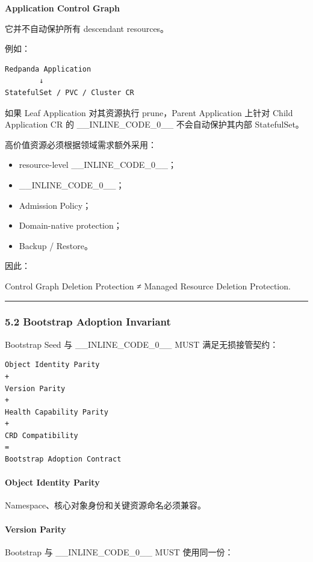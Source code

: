 \documentclass[11pt,a4paper]{article}
\begin{document}
\begin{gfmBlockquote}
\textbf{Application Control Graph}
\end{gfmBlockquote}
它并不自动保护所有 descendant resources。

例如：

\begin{lstlisting}[language=text]
Redpanda Application
        ↓
StatefulSet / PVC / Cluster CR
\end{lstlisting}
如果 Leaf Application 对其资源执行 prune，Parent Application 上针对 Child Application CR 的 \_\_INLINE\_CODE\_0\_\_ 不会自动保护其内部 StatefulSet。

高价值资源必须根据领域需求额外采用：

\begin{itemize}
  \item resource-level \_\_INLINE\_CODE\_0\_\_；
  \item \_\_INLINE\_CODE\_0\_\_；
  \item Admission Policy；
  \item Domain-native protection；
  \item Backup / Restore。
\end{itemize}
因此：

\begin{gfmBlockquote}
Control Graph Deletion Protection ≠ Managed Resource Deletion Protection.
\end{gfmBlockquote}
\vspace{0.5em}\hrule\vspace{0.5em}
\subsubsection{5.2 Bootstrap Adoption Invariant}
Bootstrap Seed 与 \_\_INLINE\_CODE\_0\_\_ MUST 满足无损接管契约：

\begin{lstlisting}[language=text]
Object Identity Parity
+
Version Parity
+
Health Capability Parity
+
CRD Compatibility
=
Bootstrap Adoption Contract
\end{lstlisting}
\paragraph{Object Identity Parity}
Namespace、核心对象身份和关键资源命名必须兼容。

\paragraph{Version Parity}
Bootstrap 与 \_\_INLINE\_CODE\_0\_\_ MUST 使用同一份：
\end{document}
